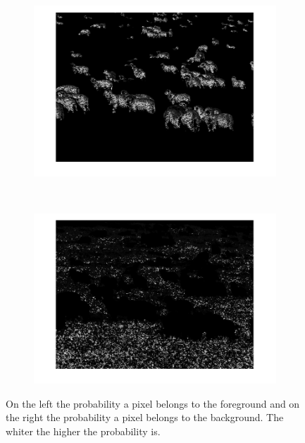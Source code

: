 \documentclass{paper}
\begin{document}
\begin{figure}[H]
    \centering
    \begin{subfigure}{0.45\textwidth}
        \includegraphics[width=\textwidth]{../../outputs/p4/image_segmentation/sheeps/prob_fg}
    \end{subfigure}
    ~
        \begin{subfigure}{0.45\textwidth}
        \includegraphics[width=\textwidth]{../../outputs/p4/image_segmentation/sheeps/prob_bg}
    \end{subfigure}
    
    \caption{On the left the probability a pixel belongs to the foreground and on the right the probability a pixel belongs to the background. The whiter the higher the probability is.}
    \label{fig:segmentation_sheeps_probabilities}       
\end{figure}
\end{document}
